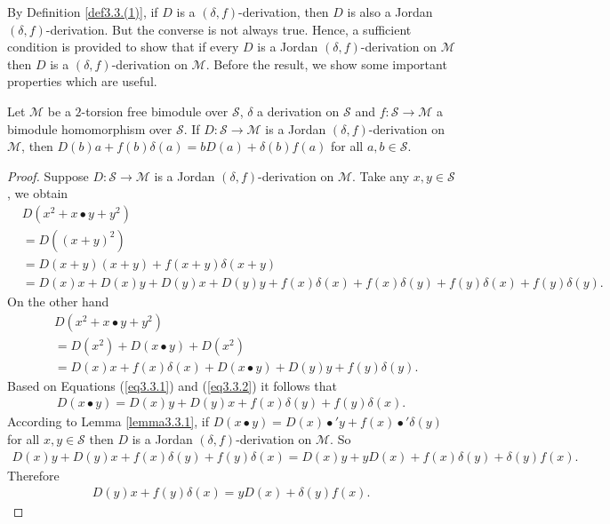 \documentclass{arxiv}
\begin{document}
By Definition \ref{def3.3.(1)}, if $D$ is a $(\delta,f)$-derivation, then $D$ is also a Jordan $(\delta,f)$-derivation. But the converse is not always true. Hence, a sufficient condition is provided to show that if every $D$ is a Jordan $(\delta,f)$-derivation on $\mathcal{M}$ then $D$ is a $(\delta,f)$-derivation on $\mathcal{M}$. Before the result, we show some important properties which are useful.  
\begin{lemma}
     Let $\mathcal{M}$ be a $2$-torsion free bimodule over $\mathcal{S}$, $\delta$ a derivation on $\mathcal{S}$ and $f : \mathcal{S} \rightarrow \mathcal{M}$ a bimodule homomorphism over $\mathcal{S}$. If $D:\mathcal{S} \rightarrow \mathcal{M}$ is a Jordan $(\delta,f)$-derivation on $\mathcal{M}$, then $D(b)a+f(b)\delta(a)=bD(a)+\delta(b)f(a)$ for all $a,b \in \mathcal{S}$.
\end{lemma}
\begin{proof}
      Suppose $D: \mathcal{S} \rightarrow \mathcal{M}$ is a Jordan $(\delta,f)$-derivation on $\mathcal{M}$. Take any $x,y \in \mathcal{S}$, we obtain
    \begin{align}
        &D(x^2+x \bullet y+ y^2) \nonumber \\
        &= D((x+y)^2) \nonumber \\
        &=D(x+y)(x+y) + f(x+y)\delta (x+y) \nonumber \\
        &= D(x)x+D(x)y+D(y)x+D(y)y+f(x)\delta (x)+f(x)\delta(y)+f(y)\delta(x)+f(y)\delta(y). \label{eq3.3.1}
    \end{align}
    On the other hand
    \begin{align}
        &D(x^2+x \bullet y + y^2) \nonumber \\
        &= D(x^2) + D(x \bullet y) + D(x^2) \nonumber \\
        &= D(x)x+f(x)\delta (x) + D(x \bullet y) + D(y)y+f(y)\delta(y). \label{eq3.3.2}
    \end{align}
    Based on Equations (\ref{eq3.3.1}) and (\ref{eq3.3.2}) it follows that
    \begin{align*}
        D(x \bullet y) = D(x)y + D(y)x+f(x)\delta(y) + f(y)\delta (x).
    \end{align*}
    According to Lemma \ref{lemma3.3.1}, if $D(x \bullet y)=D(x) \bullet' y+f(x) \bullet' \delta(y)$ for all $x,y \in \mathcal{S}$ then $D$ is a Jordan $(\delta,f)$-derivation on  $\mathcal{M}$. So
    \begin{align*}
        D(x)y + D(y)x+f(x)\delta(y) + f(y)\delta (x) = D(x)y+yD(x)+f(x)\delta(y)+\delta(y)f(x).
    \end{align*}
    Therefore
    \begin{align*}
        D(y)x+f(y)\delta(x) = yD(x)+\delta(y)f(x).
    \end{align*}
\end{proof}
\end{document}
